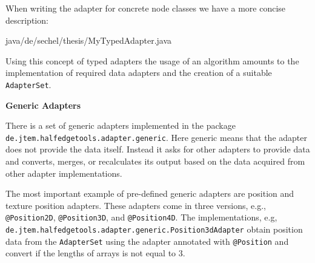 \documentclass[Thesis.tex]{subfiles}
\begin{document}
When writing the adapter for concrete node classes we have a more concise description:

 {java/de/sechel/thesis/MyTypedAdapter.java}

Using this concept of typed adapters the usage of an algorithm amounts to the implementation of
required data adapters and the creation of a suitable {\tt AdapterSet}.



{\bf Generic Adapters}

There is a set of generic adapters implemented in the package 
{\tt de.jtem.half\-edge\-tools.adap\-ter.generic}. Here generic means that the adapter does not provide
the data itself. Instead it asks for other adapters to provide data and converts, merges, or recalculates its
output based on the data acquired from other adapter implementations.

The most important example of pre-defined generic adapters are position and texture position adapters.
These adapters come in three versions, e.g., {\tt @Position2D}, {\tt @Position3D}, and {\tt @Position4D}. The implementations, e.g, {\tt de.jtem.half\-edge\-tools.adapter.generic.Position\-3dAdapter} obtain position
data from the {\tt AdapterSet} using the adapter annotated with {\tt @Position} and convert if the lengths
of arrays is not equal to $3$.
\end{document}
